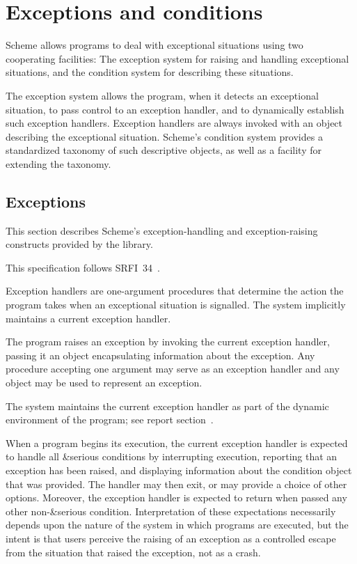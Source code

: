 \chapter{Exceptions and conditions}
\label{exceptionsconditionschapter}

Scheme allows programs to deal with exceptional situations using two
cooperating facilities: The exception system for raising and handling
exceptional situations, and the condition system for describing these
situations.

The exception system allows the program, when it detects an
exceptional situation, to pass control to an exception handler, and
to dynamically establish such exception handlers.  Exception
handlers are always invoked with an object describing the exceptional
situation.  Scheme's condition system provides a standardized taxonomy
of such descriptive objects, as well as a facility for extending the
taxonomy.

\section{Exceptions}
\label{exceptionssection}

This section describes Scheme's exception-handling and
exception-raising constructs provided by the  library.

\begin{note}
  This specification follows SRFI~34~\cite{srfi34}.
\end{note}

Exception handlers are one-argument procedures that determine the
action the program takes when an exceptional situation is signalled.
The system implicitly maintains a current exception handler.

The program raises an exception
by invoking the current exception handler, passing it an object
encapsulating information about the exception. Any procedure accepting
one argument may serve as an exception handler and any object may be
used to represent an exception.

The system maintains the current exception handler as part of the
dynamic environment of the program; see report
section~.

When a program begins its execution, the current
exception handler is expected to handle all {\cf\&serious}
conditions by interrupting execution, reporting that an
exception has been raised, and displaying information
about the condition object that was provided.  The handler
may then exit, or may provide a choice of other options.
Moreover, the exception handler is expected to return when
passed any other non-{\cf\&serious} condition.
Interpretation of these expectations necessarily depends
upon the nature of the system in which programs are executed,
but the intent is that users perceive the raising of an
exception as a controlled escape from the situation that
raised the exception, not as a crash.

